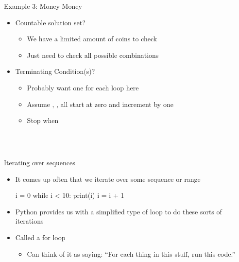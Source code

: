 \documentclass[pdf, aspectratio=169, 12pt]{beamer}
\begin{document}
\begin{frame}{Example 3: Money Money}
	\begin{itemize}
		\item Countable solution set?
			\begin{itemize}
				\item We have a limited amount of coins to check
				\item Just need to check all possible combinations
			\end{itemize}
		\item Terminating Condition(s)?
			\begin{itemize}
				\item Probably want one for each loop here
				\item Assume , ,  all start at zero and increment by one
				\item Stop when
					\begin{center}
						\\
						\\
					\end{center}
			\end{itemize}
	\end{itemize}
\end{frame}

\begin{frame}[fragile]{Iterating over sequences}
	\begin{itemize}
		\item It comes up often that we iterate over some sequence or range
			\begin{pythoncode}
				i = 0
				while i < 10:
					print(i)
					i = i + 1
			\end{pythoncode}
		\item Python provides us with a simplified type of loop to do these sorts of iterations
		\item Called a \alert{for} loop
			\begin{itemize}
				\item Can think of it as saying: ``\alert{For} each thing in this stuff, run this code.''
			\end{itemize}
	\end{itemize}
\end{frame}
\end{document}
